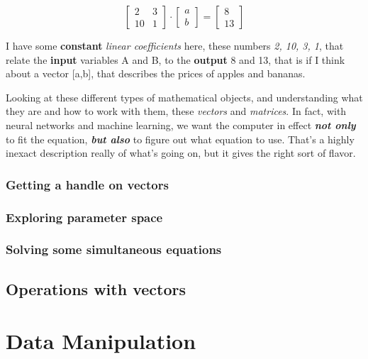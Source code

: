 \documentclass[]{article}
\begin{document}
\begin{equation} \label{eq2}
	\begin{bmatrix}
	2 & 3 \\
	10 & 1
	\end{bmatrix}
	\cdot
	\begin{bmatrix}
	a \\
	b
	\end{bmatrix}
	=
	\begin{bmatrix}
	8 \\
	13
	\end{bmatrix}
\end{equation}

I have some \textbf{constant} \textit{linear coefficients} here, these numbers \textit{2, 10, 3, 1}, that relate the \textbf{input} variables A and B, to the \textbf{output} 8 and 13, that is if I think about a vector [a,b], that describes the prices of apples and bananas.

Looking at these different types of mathematical objects, and understanding what they are and how to work with them, these \textit{vectors} and \textit{matrices}. In fact, with neural networks and machine learning, we want the computer in effect \textbf{\textit{not only}} to fit the equation, \textbf{\textit{but also}} to figure out what equation to use. That's a highly inexact description really of what's going on, but it gives the right sort of flavor.

\subsubsection{Getting a handle on vectors}

\subsubsection{Exploring parameter space}

\subsubsection{Solving some simultaneous equations}

\subsection{Operations with vectors}

\section{Data Manipulation}
\end{document}
